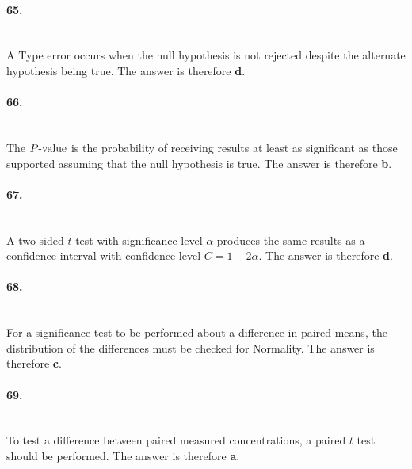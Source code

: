 \documentclass[../Homework]{subfiles}
\begin{document}
		\paragraph{65.}\ \\
			A Type  error occurs when the null hypothesis is not rejected despite the alternate hypothesis being true. The answer is therefore \textbf{d}.
		\paragraph{66.}\ \\
			The $P\text{-value}$ is the probability of receiving results at least as significant as those supported assuming that the null hypothesis is true. The answer is therefore \textbf{b}.
		\paragraph{67.}\ \\
			A two-sided $t$ test with significance level $\alpha$ produces the same results as a confidence interval with confidence level $C = 1 - 2\alpha$. The answer is therefore \textbf{d}.
		\paragraph{68.}\ \\
			For a significance test to be performed about a difference in paired means, the distribution of the differences must be checked for Normality. The answer is therefore \textbf{c}.
		\paragraph{69.}\ \\
			To test a difference between paired measured concentrations, a paired $t$ test should be performed. The answer is therefore \textbf{a}.
\end{document}
